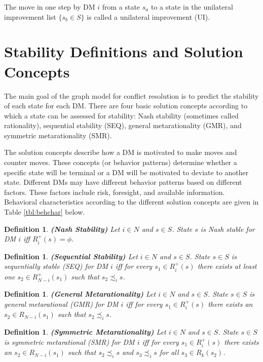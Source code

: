 \documentclass[letterpaper,12pt,titlepage,oneside,final]{book}
\newtheorem{definition}[lemma]{Definition}
\begin{document}
The move in one step by DM $i$ from a state $s_a$ to a state in the unilateral improvement list $\{s_b\in S\}$ is called a unilateral improvement (UI).

\section{Stability Definitions and Solution Concepts}

The main goal of the graph model for conflict resolution is to predict the stability of each state for each DM. There are four basic solution concepts according to which a state can be assessed for stability: Nash stability (sometimes called rationality), sequential stability (SEQ), general metarationality (GMR), and  symmetric metarationality (SMR). 

The solution concepts describe how a DM is motivated to make moves and counter moves. These concepts (or behavior patterns) determine whether a specific state will be terminal or a DM will be motivated to deviate to another state. Different DMs may have different behavior patterns based on different factors. These factors include risk, foresight, and available information. Behavioral characteristics according to the different solution concepts are given in Table \ref{tbl:behchar} below. 

\begin{definition}
\rm {\bf (Nash Stability)} Let $i \in N$ and $s \in
S$. State $s$ is \emph{Nash stable} for DM $i$ \emph{iff} $R_i^+(s)=\phi$.
\end{definition}

\begin{definition}
\rm {\bf (Sequential Stability)} Let $i \in N$ and $s \in
S$. State $s \in S$ is \emph{sequentially stable} (\emph{SEQ}) for DM $i$ \emph{iff} for every $s_1 \in R_i^+(s)$ there exists at least one $s_2 \in R_{N-i}^+(s_1)$
such that $s_2 \precsim_i s$.
\end{definition}

\begin{definition}
\rm {\bf (General Metarationality)} Let $i \in N$ and $s \in
S$. State $s \in S$ is \emph{general metarational} (\emph{GMR}) for DM $i$ \emph{iff} for every $s_1 \in R_i^+(s)$ there exists an $s_2 \in
R_{N-i}(s_1)$ such that $s_2 \precsim_i s$.
\end{definition}

\begin{definition}
\rm {\bf (Symmetric Metarationality)}  Let $i \in N$ and $s \in
S$. State $s \in S$ is \emph{symmetric metarational} (\emph{SMR}) for DM $i$ \emph{iff} for every $s_1 \in R_i^+(s)$ there exists an $s_2 \in
R_{N-i}(s_1)$ such that $s_2 \precsim_i s$ and $s_3 \precsim_i s$
for all $s_3 \in R_k(s_2)$.
\end{definition}
\end{document}
